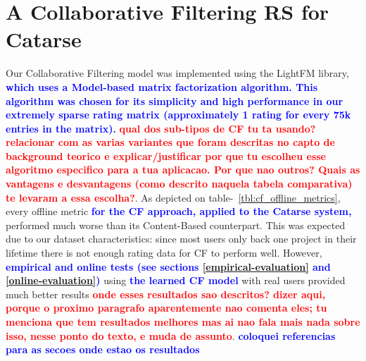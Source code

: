 \documentclass[cic,tc,english]{iiufrgs}
\newcommand{\bruno}[1]{\textcolor{red}{\textbf{#1}}}
\newcommand{\adriano}[1]{\textcolor{blue}{\textbf{#1}}}
\begin{document}
\section{A Collaborative Filtering RS for Catarse}
Our Collaborative Filtering model was implemented using the LightFM library, \adriano{which uses a Model-based matrix factorization algorithm. This algorithm was chosen for its simplicity and high performance in our extremely sparse rating matrix (approximately 1 rating for every 75k entries in the matrix).} \bruno{qual dos sub-tipos de CF tu ta usando? relacionar com as varias variantes que foram descritas no capto de background teorico e explicar/justificar por que tu escolheu esse algoritmo especifico para a tua aplicacao. Por que nao outros? Quais as vantagens e desvantagens (como descrito naquela tabela comparativa) te levaram a essa escolha?}. As depicted on table-~\ref{tbl:cf_offline_metrics}, every offline metric \adriano{for the CF approach, applied to the Catarse system,} performed much worse than its Content-Based counterpart. This was expected due to our dataset characteristics: since most users only back one project in their lifetime there is not enough rating data for CF to perform well. However, \adriano{empirical and online tests (see sections \ref{empirical-evaluation} and \ref{online-evaluation})} using \adriano{the learned CF model} with real users provided much better results \bruno{onde esses resultados sao descritos? dizer aqui, porque o proximo paragrafo aparentemente nao comenta eles; tu menciona que tem resultados melhores mas ai nao fala mais nada sobre isso, nesse ponto do texto, e muda de assunto}. \adriano{coloquei referencias para as secoes onde estao os resultados}
\end{document}

